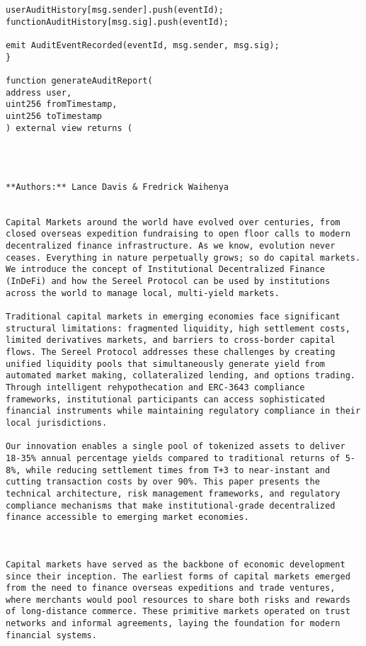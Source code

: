 \documentclass[12pt]{article}
\begin{document}
{{{\begin{itemize}
\begin{lstlisting}
userAuditHistory[msg.sender].push(eventId);
functionAuditHistory[msg.sig].push(eventId);

emit AuditEventRecorded(eventId, msg.sender, msg.sig);
}

function generateAuditReport(
address user,
uint256 fromTimestamp,
uint256 toTimestamp
) external view returns (




**Authors:** Lance Davis & Fredrick Waihenya


Capital Markets around the world have evolved over centuries, from closed overseas expedition fundraising to open floor calls to modern decentralized finance infrastructure. As we know, evolution never ceases. Everything in nature perpetually grows; so do capital markets. We introduce the concept of Institutional Decentralized Finance (InDeFi) and how the Sereel Protocol can be used by institutions across the world to manage local, multi-yield markets.

Traditional capital markets in emerging economies face significant structural limitations: fragmented liquidity, high settlement costs, limited derivatives markets, and barriers to cross-border capital flows. The Sereel Protocol addresses these challenges by creating unified liquidity pools that simultaneously generate yield from automated market making, collateralized lending, and options trading. Through intelligent rehypothecation and ERC-3643 compliance frameworks, institutional participants can access sophisticated financial instruments while maintaining regulatory compliance in their local jurisdictions.

Our innovation enables a single pool of tokenized assets to deliver 18-35% annual percentage yields compared to traditional returns of 5-8%, while reducing settlement times from T+3 to near-instant and cutting transaction costs by over 90%. This paper presents the technical architecture, risk management frameworks, and regulatory compliance mechanisms that make institutional-grade decentralized finance accessible to emerging market economies.



Capital markets have served as the backbone of economic development since their inception. The earliest forms of capital markets emerged from the need to finance overseas expeditions and trade ventures, where merchants would pool resources to share both risks and rewards of long-distance commerce. These primitive markets operated on trust networks and informal agreements, laying the foundation for modern financial systems.


\end{lstlisting}
\end{itemize}}}}
\end{document}
